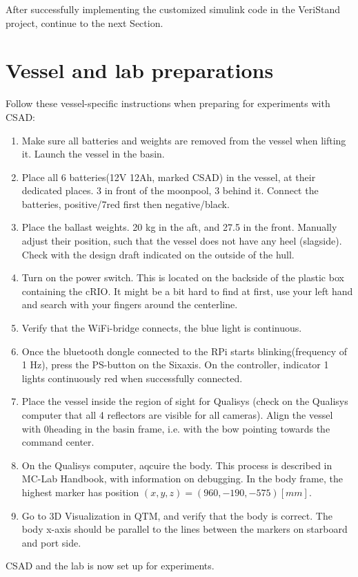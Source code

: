 After successfully implementing the customized simulink code in the VeriStand project, continue to the next Section. 

\section{Vessel and lab preparations}
Follow these vessel-specific instructions when preparing for experiments with CSAD: 
\begin{enumerate}
	\item Make sure all batteries and weights are removed from the vessel when lifting it. Launch the vessel in the basin. 
	\item Place all 6 batteries(12V 12Ah, marked CSAD) in the vessel, at their dedicated places. 3 in front of the moonpool, 3 behind it. Connect the batteries, positive/7red first then negative/black. 
	\item Place the ballast weights. 20 kg in the aft, and 27.5 in the front. Manually adjust their position, such that the vessel does not have any heel (slagside). Check with the design draft indicated on the outside of the hull. 
	\item Turn on the power switch. This is located on the backside of the plastic box containing the cRIO. It might be a bit hard to find at first, use your left hand and search with your fingers around the centerline. 
	\item Verify that the WiFi-bridge connects, the blue light is continuous. 
	\item Once the bluetooth dongle connected to the RPi starts blinking(frequency of 1 Hz), press the PS-button on the Sixaxis. On the controller, indicator 1 lights continuously red when successfully connected. 
	\item Place the vessel inside the region of sight for Qualisys (check on the Qualisys computer that all 4 reflectors are visible for all cameras). Align the vessel with 0\degree heading in the basin frame, i.e. with the bow pointing towards the command center. 
	\item On the Qualisys computer, aqcuire the body. This process is described in MC-Lab Handbook, with information on debugging. In the body frame, the highest marker has position $(x,y,z)=(960,-190,-575)[mm]$. 
	\item Go to 3D Visualization in QTM, and verify that the body is correct. The body x-axis should be parallel to the lines between the markers on starboard and port side.
\end{enumerate}
CSAD and the lab is now set up for experiments. 
